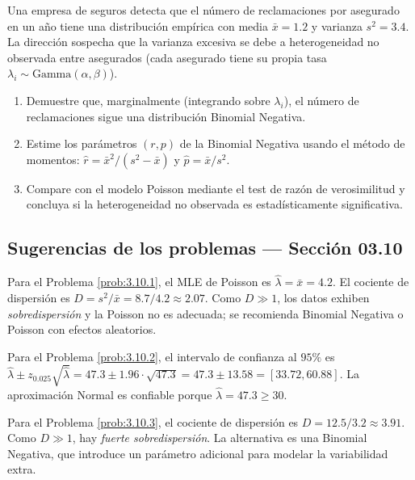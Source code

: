 \begin{problema}
	\label{prob:3.10.10}
	Una empresa de seguros detecta que el número de reclamaciones por asegurado en un año tiene una distribución empírica con media $\bar{x} = 1.2$ y varianza $s^{2} = 3.4$. La dirección sospecha que la varianza excesiva se debe a heterogeneidad no observada entre asegurados (cada asegurado tiene su propia tasa $\lambda_{i} \sim \text{Gamma}(\alpha, \beta)$).
	\begin{enumerate}
		\item Demuestre que, marginalmente (integrando sobre $\lambda_{i}$), el número de reclamaciones sigue una distribución Binomial Negativa.
		\item Estime los parámetros $(r, p)$ de la Binomial Negativa usando el método de momentos: $\hat{r} = \bar{x}^{2}/(s^{2} - \bar{x})$ y $\hat{p} = \bar{x}/s^{2}$.
		\item Compare con el modelo Poisson mediante el test de razón de verosimilitud y concluya si la heterogeneidad no observada es estadísticamente significativa.
	\end{enumerate}
\end{problema}

\subsection*{Sugerencias de los problemas --- Sección 03.10}

\begin{sugerencia}
	\label{sug:3.10.1}
	Para el Problema \ref{prob:3.10.1}, el MLE de Poisson es $\hat{\lambda} = \bar{x} = 4.2$. El cociente de dispersión es $D = s^{2}/\bar{x} = 8.7/4.2 \approx 2.07$. Como $D \gg 1$, los datos exhiben \emph{sobredispersión} y la Poisson no es adecuada; se recomienda Binomial Negativa o Poisson con efectos aleatorios.
\end{sugerencia}

\begin{sugerencia}
	\label{sug:3.10.2}
	Para el Problema \ref{prob:3.10.2}, el intervalo de confianza al $95\%$ es $\hat{\lambda} \pm z_{0.025}\sqrt{\hat{\lambda}} = 47.3 \pm 1.96 \cdot \sqrt{47.3} = 47.3 \pm 13.58 = [33.72, 60.88]$. La aproximación Normal es confiable porque $\hat{\lambda} = 47.3 \ge 30$.
\end{sugerencia}

\begin{sugerencia}
	\label{sug:3.10.3}
	Para el Problema \ref{prob:3.10.3}, el cociente de dispersión es $D = 12.5/3.2 \approx 3.91$. Como $D \gg 1$, hay \emph{fuerte sobredispersión}. La alternativa es una Binomial Negativa, que introduce un parámetro adicional para modelar la variabilidad extra.
\end{sugerencia}

